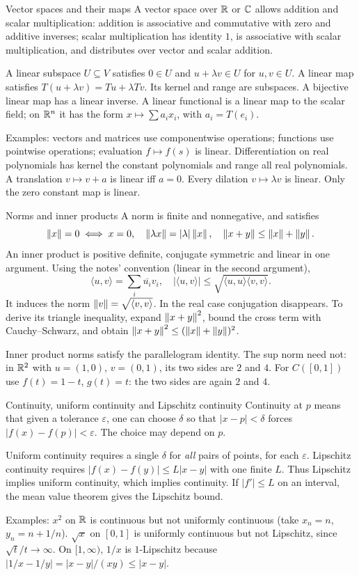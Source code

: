 \begin{note}{Vector spaces and their maps}
A vector space over $\mathbb R$ or $\mathbb C$ allows addition and scalar multiplication: addition is associative and commutative with zero and additive inverses; scalar multiplication has identity $1$, is associative with scalar multiplication, and distributes over vector and scalar addition.

A linear subspace $U\subseteq V$ satisfies $0\in U$ and $u+\lambda v\in U$ for $u,v\in U$. A linear map satisfies $T(u+\lambda v)=Tu+\lambda Tv$. Its kernel and range are subspaces. A bijective linear map has a linear inverse. A linear functional is a linear map to the scalar field; on $\mathbb R^n$ it has the form $x\mapsto\sum a_ix_i$, with $a_i=T(e_i)$.

Examples: vectors and matrices use componentwise operations; functions use pointwise operations; evaluation $f\mapsto f(s)$ is linear. Differentiation on real polynomials has kernel the constant polynomials and range all real polynomials. A translation $v\mapsto v+a$ is linear iff $a=0$. Every dilation $v\mapsto\lambda v$ is linear. Only the zero constant map is linear.
\end{note}
\begin{note}{Norms and inner products}
A norm is finite and nonnegative, and satisfies
\[\left\lVert x\right\rVert=0\iff x=0,\quad\left\lVert\lambda x\right\rVert=|\lambda|\left\lVert x\right\rVert,\quad\left\lVert x+y\right\rVert\le\left\lVert x\right\rVert+\left\lVert y\right\rVert.\]
An inner product is positive definite, conjugate symmetric and linear in one argument. Using the notes' convention (linear in the second argument),
\[\langle u,v\rangle=\sum_i\overline{u_i}v_i,\quad |\langle u,v\rangle|\le\sqrt{\langle u,u\rangle\langle v,v\rangle}.\]
It induces the norm $\left\lVert v\right\rVert=\sqrt{\langle v,v\rangle}$. In the real case conjugation disappears. To derive its triangle inequality, expand $\left\lVert x+y\right\rVert^2$, bound the cross term with Cauchy--Schwarz, and obtain $\left\lVert x+y\right\rVert^2\le(\left\lVert x\right\rVert+\left\lVert y\right\rVert)^2$.

Inner product norms satisfy the parallelogram identity. The sup norm need not: in $\mathbb R^2$ with $u=(1,0)$, $v=(0,1)$, its two sides are $2$ and $4$. For $C([0,1])$ use $f(t)=1-t$, $g(t)=t$: the two sides are again $2$ and $4$.
\end{note}
\begin{note}{Continuity, uniform continuity and Lipschitz continuity}
Continuity at $p$ means that given a tolerance $\varepsilon$, one can choose $\delta$ so that $|x-p|<\delta$ forces $|f(x)-f(p)|<\varepsilon$. The choice may depend on $p$.

Uniform continuity requires a single $\delta$ for \emph{all} pairs of points, for each $\varepsilon$. Lipschitz continuity requires $|f(x)-f(y)|\le L|x-y|$ with one finite $L$. Thus Lipschitz implies uniform continuity, which implies continuity. If $|f'|\le L$ on an interval, the mean value theorem gives the Lipschitz bound.

Examples: $x^2$ on $\mathbb R$ is continuous but not uniformly continuous (take $x_n=n$, $y_n=n+1/n$). $\sqrt x$ on $[0,1]$ is uniformly continuous but not Lipschitz, since $\sqrt t/t\to\infty$. On $[1,\infty)$, $1/x$ is $1$-Lipschitz because $|1/x-1/y|=|x-y|/(xy)\le|x-y|$.
\end{note}
